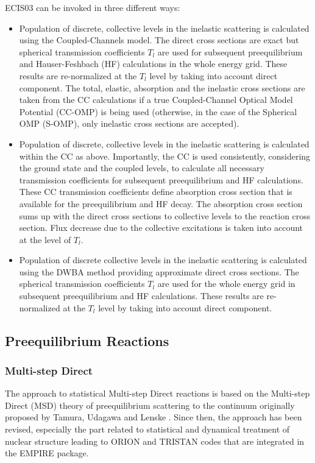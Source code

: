 \documentclass[twocolumn,amsmath,amssymb,10pt,groupedaddress,a4paper]{revtex4}
\begin{document}
ECIS03 can be invoked in three different ways:
\begin{itemize}
\item Population of discrete, collective levels in the inelastic
scattering is calculated using the Coupled-Channels
model. The direct cross sections are exact but spherical transmission
coefficients $T_{l}$ are used for subsequent preequilibrium and Hauser-Feshbach (HF)
calculations in the whole energy grid. These results are re-normalized
at the $T_{l}$ level by taking into account direct component. The
total, elastic, absorption and the inelastic cross sections are taken
from the CC calculations if a true Coupled-Channel Optical Model Potential
(CC-OMP) is being used (otherwise, in the case of the Spherical OMP
(S-OMP), only inelastic cross sections are accepted).
\item Population of discrete, collective levels in the inelastic
scattering is calculated within the CC as above. Importantly, the
CC is used consistently, considering the ground state and the coupled
levels, to calculate all necessary transmission coefficients for subsequent
preequilibrium and HF calculations. These
CC transmission coefficients define absorption cross section that
is available for the preequilibrium and HF decay. The absorption cross
section sums up with the direct cross sections to collective levels
to the reaction cross section. Flux decrease due to the collective excitations
is taken into account at the level of $T_{l}$.
\item Population of discrete collective levels in the inelastic
scattering is calculated using the DWBA method providing
approximate direct cross sections. The spherical transmission coefficients
$T_{l}$ are used for the whole energy grid in subsequent preequilibrium
and HF calculations. These results are re-normalized
at the $T_{l}$ level by taking into account direct component.

\end{itemize}

\subsection{Preequilibrium Reactions}
\subsubsection{Multi-step Direct\label{sec: MSD}}
The approach to statistical Multi-step Direct reactions
is based on the Multi-step Direct (MSD) theory of preequilibrium scattering
to the continuum originally proposed by Tamura, Udagawa and Lenske
\cite{TUL}. Since then, the approach has been revised, especially
the part related to statistical and dynamical treatment of nuclear
structure leading to ORION and TRISTAN codes that are integrated in
the EMPIRE package.
\end{document}
